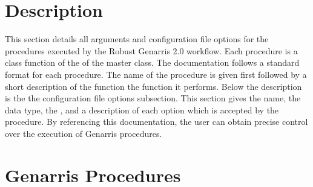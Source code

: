 \documentclass[letterpaper,10pt,english]{sphinxmanual}
\begin{document}
\section{Description}
\label{\detokenize{index:description}}
This section details all arguments and configuration file
options for the procedures executed by the Robust Genarris 2.0 workflow. Each
procedure is a class function of the of the  master class.
The documentation follows a standard format for each procedure. The name
of the procedure is given first followed by a short description of the function
the function it performs. Below the description is the the configuration file
options subsection. This section gives the name, the data type,
the {\hyperref[\detokenize{index:category}]{}}, and a description of each option which is accepted by the
procedure. By referencing this documentation, the user can obtain precise
control over the execution of Genarris procedures.


\section{Genarris Procedures}
\label{\detokenize{index:genarris-procedures}}
\end{document}
